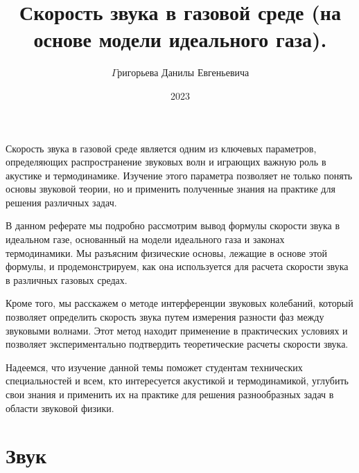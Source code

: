 \documentclass[referat,times]{SCWorks}
\begin{document}
\title{Скорость звука в газовой среде (на основе модели идеального газа).}
\author{$\Gamma$ригорьева Данилы Евгеньевича}
\date{2023}

\maketitle

\secNumbering

\tableofcontents

\newpage

\intro
\par Скорость звука в газовой среде является одним из ключевых параметров, определяющих распространение звуковых волн и играющих важную роль в акустике и термодинамике. Изучение этого параметра позволяет не только понять основы звуковой теории, но и применить полученные знания на практике для решения различных задач.
\par В данном реферате мы подробно рассмотрим вывод формулы скорости звука в идеальном газе, основанный на модели идеального газа и законах термодинамики. Мы разъясним физические основы, лежащие в основе этой формулы, и продемонстрируем, как она используется для расчета скорости звука в различных газовых средах.
\par Кроме того, мы расскажем о методе интерференции звуковых колебаний, который позволяет определить скорость звука путем измерения разности фаз между звуковыми волнами. Этот метод находит применение в практических условиях и позволяет экспериментально подтвердить теоретические расчеты скорости звука.
\par Надеемся, что изучение данной темы поможет студентам технических специальностей и всем, кто интересуется акустикой и термодинамикой, углубить свои знания и применить их на практике для решения разнообразных задач в области звуковой физики.

\section{Звук}
\end{document}
